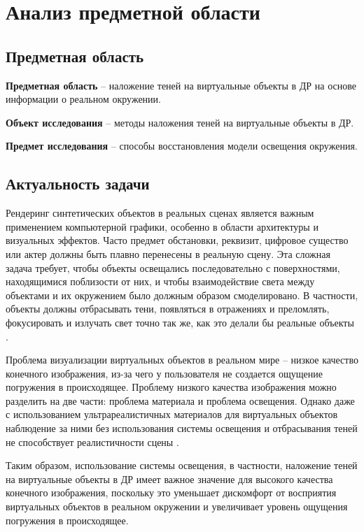 \chapter{Анализ предметной области}

\section{Предметная область}

\textbf{Предметная область} -- наложение теней  на виртуальные объекты в ДР на основе информации о реальном окружении.

\textbf{Объект исследования} -- методы наложения теней  на виртуальные объекты в ДР.

\textbf{Предмет исследования} -- способы восстановления модели освещения окружения.

\section{Актуальность задачи}

Рендеринг синтетических объектов в реальных сценах является важным применением компьютерной графики, особенно в области архитектуры и визуальных эффектов. Часто предмет обстановки, реквизит, цифровое существо или актер должны быть плавно перенесены в реальную сцену. Эта сложная задача требует, чтобы объекты освещались последовательно с поверхностями, находящимися поблизости от них, и чтобы взаимодействие света между объектами и их окружением было должным образом смоделировано. В частности, объекты должны отбрасывать тени, появляться в отражениях и преломлять, фокусировать и излучать свет точно так же, как это делали бы реальные объекты \cite{debevec2008rendering}.

Проблема визуализации виртуальных объектов в реальном мире -- низкое качество конечного изображения, из-за чего у пользователя не создается ощущение погружения в происходящее. Проблему низкого качества изображения можно разделить на две части: проблема материала и проблема освещения. Однако даже с использованием ультрареалистичных материалов для виртуальных объектов наблюдение за ними без использования системы освещения и отбрасывания теней не способствует реалистичности сцены \cite{osti2019real}.

Таким образом, использование системы освещения, в частности, наложение теней на виртуальные объекты в ДР имеет важное значение для высокого качества конечного изображения, поскольку это уменьшает дискомфорт от восприятия виртуальных объектов в реальном окружении и увеличивает уровень ощущения погружения в происходящее.

